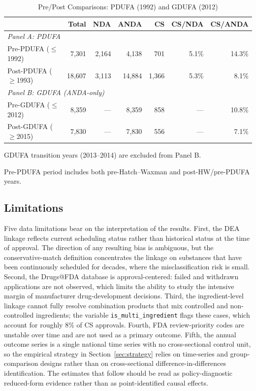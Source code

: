 \begin{table}[htbp]
\centering
\begin{threeparttable}
\caption{Pre/Post Comparisons: PDUFA (1992) and GDUFA (2012)}
\label{tab:prepost_summary}
\small
\begin{tabular}{lrrrrrr}
\toprule
 & Total & NDA & ANDA & CS & CS/NDA & CS/ANDA \\
\midrule
\multicolumn{7}{l}{\textit{Panel A: PDUFA}} \\
Pre-PDUFA ($\leq$1992) & 7,301 & 2,164 & 4,138 & 701 & 5.1\% & 14.3\% \\
Post-PDUFA ($\geq$1993) & 18,607 & 3,113 & 14,884 & 1,366 & 5.3\% & 8.1\% \\
\midrule
\multicolumn{7}{l}{\textit{Panel B: GDUFA (ANDA-only)}} \\
Pre-GDUFA ($\leq$2012) & 8,359 & --- & 8,359 & 858 & --- & 10.8\% \\
Post-GDUFA ($\geq$2015) & 7,830 & --- & 7,830 & 556 & --- & 7.1\% \\
\bottomrule
\end{tabular}
\begin{tablenotes}
\footnotesize
\item GDUFA transition years (2013--2014) are excluded from Panel B.
\item Pre-PDUFA period includes both pre-Hatch--Waxman and post-HW/pre-PDUFA years.
\end{tablenotes}
\end{threeparttable}
\end{table}

\subsection{Limitations}

Five data limitations bear on the interpretation of the results. First, the DEA linkage reflects current scheduling status rather than historical status at the time of approval. The direction of any resulting bias is ambiguous, but the conservative-match definition concentrates the linkage on substances that have been continuously scheduled for decades, where the misclassification risk is small. Second, the Drugs@FDA database is approval-centered: failed and withdrawn applications are not observed, which limits the ability to study the intensive margin of manufacturer drug-development decisions. Third, the ingredient-level linkage cannot fully resolve combination products that mix controlled and non-controlled ingredients; the variable \texttt{is\_multi\_ingredient} flags these cases, which account for roughly 8\% of CS approvals. Fourth, FDA review-priority codes are unstable over time and are not used as a primary outcome. Fifth, the annual outcome series is a single national time series with no cross-sectional control unit, so the empirical strategy in Section~\ref{sec:strategy} relies on time-series and group-comparison designs rather than on cross-sectional difference-in-differences identification. The estimates that follow should be read as policy-diagnostic reduced-form evidence rather than as point-identified causal effects.
